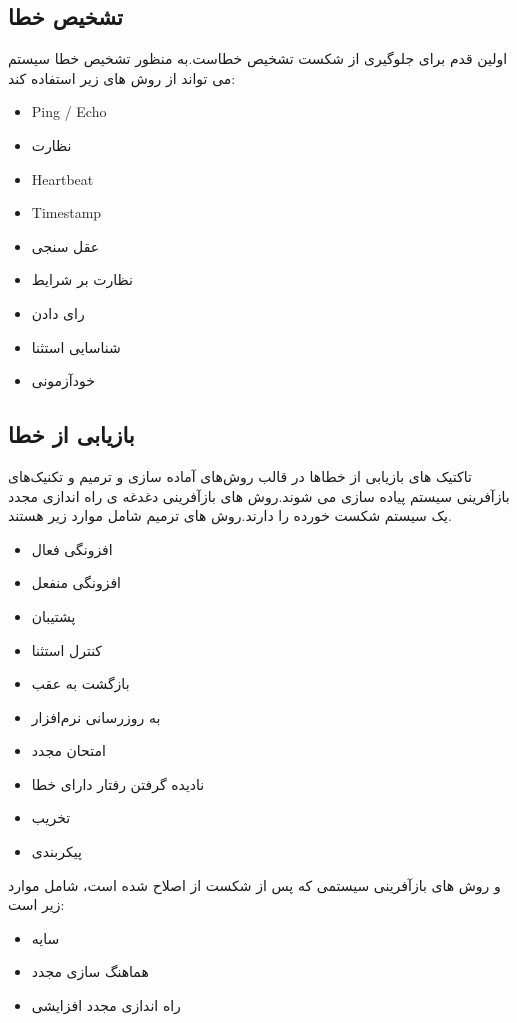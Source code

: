\subsection{تشخیص خطا}
اولین قدم برای جلوگیری از شکست تشخیص خطاست.به منظور تشخیص خطا سیستم می تواند از روش های زیر استفاده کند:
\begin{itemize}
\item
Ping / Echo
\item
نظارت
\item
Heartbeat
\item
Timestamp
\item
عقل سنجی
\item
نظارت بر شرایط
\item
رای دادن 
\item
شناسایی استثنا
\item
خودآزمونی 
\end{itemize}
\subsection{بازیابی از خطا}
تاکتیک های بازیابی از خطاها در قالب روش‌های آماده سازی و ترمیم و تکنیک‌های بازآفرینی سیستم پیاده سازی می شوند.روش های بازآفرینی دغدغه ی راه اندازی مجدد یک سیستم شکست خورده را دارند.روش های ترمیم شامل موارد زیر هستند.
\begin{itemize}
\item
افزونگی فعال 
\item
افزونگی منفعل 
\item
پشتیبان 
\item
کنترل استثنا 
\item
بازگشت به عقب 
\item
به روز‌رسانی نرم‌افزار 
\item
امتحان مجدد 
\item
نادیده گرفتن رفتار دارای خطا
\item
تخریب 
\item
پیکربندی 
\end{itemize}
و روش های بازآفرینی سیستمی که پس از شکست از اصلاح شده است، شامل موارد زیر است:
\begin{itemize}
\item
سایه 
\item
هماهنگ سازی مجدد 
\item
راه اندازی مجدد افزایشی 
\end{itemize}
